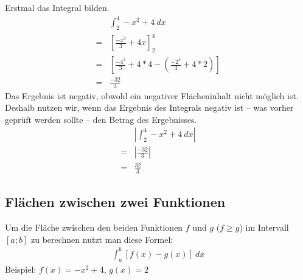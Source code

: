 \begin{center}
\end{center}

\begin{flushleft}
    Erstmal das Integral bilden.
    \begin{align}
        &\int_{2}^{4} -x^2+4 \ dx \\
        = &\left[\frac{-x^3}{3}+4x\right]_{2}^{4} \\
        = &\left[\frac{-4^3}{3}+4*4-\left(\frac{-2^3}{3}+4*2\right)\right] \\
        = &\frac{-32}{3}
    \end{align}
    Das Ergebnis ist negativ, obwohl ein negativer Flächeninhalt nicht möglich ist.
    Deshalb nutzen wir, wenn das Ergebnis des Integrals negativ ist -- was vorher geprüft werden sollte -- den Betrag des Ergebnisses.
    \begin{align}
        & \left | \int_{2}^{4} -x^2+4 \ dx \right | \\
        = & \left | \frac{-32}{3} \right | \\
        = &\frac{32}{3}
    \end{align}
\end{flushleft}

\subsection{Flächen zwischen zwei Funktionen}
\begin{flushleft}
    Um die Fläche zwischen den beiden Funktionen $f$ und $g$ ($f \geq g$) im Intervall $[a;b]$ zu berechnen nutzt man diese Formel:
    \begin{align}
        \int_{a}^{b} \left[f(x)-g(x)\right] \ dx
    \end{align}
    Beispiel: $f(x)=-x^2+4$, $g(x)=2$
\end{flushleft}

